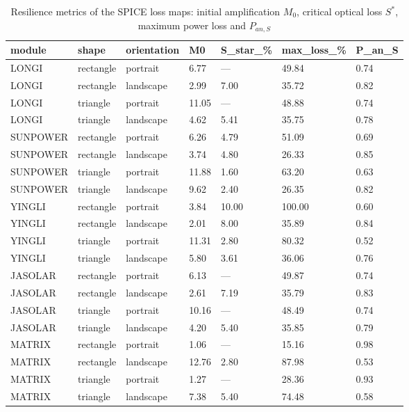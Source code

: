 \begin{table}[htbp]
\centering
\caption{Resilience metrics of the SPICE loss maps: initial amplification $M_0$, critical optical loss $S^*$, maximum power loss and $P_{an,S}$}
\label{tab:resilience_metrics}
\begin{tabular}{@{}lllllll@{}}
\toprule
module & shape & orientation & M0 & S\_star\_\% & max\_loss\_\% & P\_an\_S \\
\midrule
LONGI & rectangle & portrait & 6.77 & --- & 49.84 & 0.74 \\
LONGI & rectangle & landscape & 2.99 & 7.00 & 35.72 & 0.82 \\
LONGI & triangle & portrait & 11.05 & --- & 48.88 & 0.74 \\
LONGI & triangle & landscape & 4.62 & 5.41 & 35.75 & 0.78 \\
SUNPOWER & rectangle & portrait & 6.26 & 4.79 & 51.09 & 0.69 \\
SUNPOWER & rectangle & landscape & 3.74 & 4.80 & 26.33 & 0.85 \\
SUNPOWER & triangle & portrait & 11.88 & 1.60 & 63.20 & 0.63 \\
SUNPOWER & triangle & landscape & 9.62 & 2.40 & 26.35 & 0.82 \\
YINGLI & rectangle & portrait & 3.84 & 10.00 & 100.00 & 0.60 \\
YINGLI & rectangle & landscape & 2.01 & 8.00 & 35.89 & 0.84 \\
YINGLI & triangle & portrait & 11.31 & 2.80 & 80.32 & 0.52 \\
YINGLI & triangle & landscape & 5.80 & 3.61 & 36.06 & 0.76 \\
JASOLAR & rectangle & portrait & 6.13 & --- & 49.87 & 0.74 \\
JASOLAR & rectangle & landscape & 2.61 & 7.19 & 35.79 & 0.83 \\
JASOLAR & triangle & portrait & 10.16 & --- & 48.49 & 0.74 \\
JASOLAR & triangle & landscape & 4.20 & 5.40 & 35.85 & 0.79 \\
MATRIX & rectangle & portrait & 1.06 & --- & 15.16 & 0.98 \\
MATRIX & rectangle & landscape & 12.76 & 2.80 & 87.98 & 0.53 \\
MATRIX & triangle & portrait & 1.27 & --- & 28.36 & 0.93 \\
MATRIX & triangle & landscape & 7.38 & 5.40 & 74.48 & 0.58 \\
\bottomrule
\end{tabular}
\end{table}

